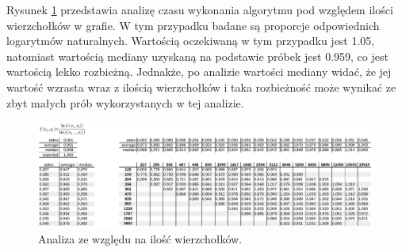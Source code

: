 \documentclass[10pt,a4paper]{article}
\begin{document}
Rysunek \ref{fig:vertex-element} przedstawia analizę czasu wykonania algorytmu pod względem ilości wierzchołków w grafie. W tym przypadku badane są proporcje odpowiednich logarytmów naturalnych. Wartością oczekiwaną w tym przypadku jest 1.05, natomiast wartością mediany uzyskaną na podstawie próbek jest 0.959, co jest wartością lekko rozbieżną. Jednakże, po analizie wartości mediany widać, że jej wartość wzrasta wraz z ilością wierzchołków i taka rozbieżność może wynikać ze zbyt małych prób wykorzystanych w tej analizie.

\begin{figure}[H]
	\centering
	\includegraphics[scale=0.3]{vertex-element}
	\caption{Analiza ze względu na ilość wierzchołków.	\label{fig:vertex-element}}
\end{figure}
\end{document}
